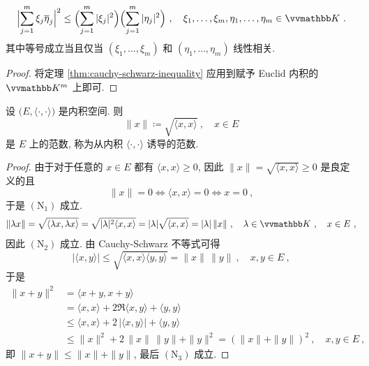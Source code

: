 \begin{corollary}\label{cor:classic-cauchy-schwarz-inequality}
    \[
        \Bigl|\sum_{j = 1}^m \xi_j \overline \eta_j\Bigr|^2 \leq \Bigl(\sum_{j = 1}^m |\xi_j|^2\Bigr) \Bigl(\sum_{j = 1}^m |\eta_j|^2\Bigr)\ ,\quad \xi_1, \ldots, \xi_m, \eta_1, \ldots, \eta_m \in \K\ .
    \]
    其中等号成立当且仅当 \((\xi_1, \ldots, \xi_m)\) 和 \((\eta_1, \ldots, \eta_m)\) 线性相关.
\end{corollary}

\begin{proof}
    将定理 \ref{thm:cauchy-schwarz-inequality} 应用到赋予 Euclid 内积的 \(\K^m\) 上即可.
\end{proof}

\begin{theorem}\label{thm:norm-induced-from-inner-produc}
    设 \(\bigl(E, \langle \cdot, \cdot \rangle\bigr)\) 是内积空间. 则
    \[
        \|x\| \coloneqq \sqrt{\langle x, x \rangle}\ ,\quad x \in E
    \]
    是 \(E\) 上的范数, 称为从内积 \(\langle \cdot, \cdot \rangle\) 诱导的范数.
\end{theorem}

\begin{proof}
    由于对于任意的 \(x \in E\) 都有 \(\langle x, x \rangle \geq 0\), 因此 \(\|x\| = \sqrt{\langle x, x \rangle} \geq 0\) 是良定义的且 
    \[
        \|x\| = 0 \iff \langle x, x \rangle = 0 \iff x = 0\ ,
    \]
    于是 \hyperref[ax:norm]{\((\mathrm N_1)\)} 成立.
    \[
        \|\lambda x\| = \sqrt{\langle \lambda x, \lambda x \rangle} = \sqrt{|\lambda|^2 \langle x, x \rangle} = |\lambda| \sqrt{\langle x, x \rangle} = |\lambda|\, \|x\|\ ,\quad \lambda \in \K\ ,\quad x \in E\ ,
    \]
    因此 \hyperref[ax:norm]{\((\mathrm N_2)\)} 成立. 由 Cauchy-Schwarz 不等式可得
    \[
        |\langle x, y \rangle| \leq \sqrt{\langle x, x \rangle \langle y, y \rangle} = \|x\|\, \|y\|\ ,\quad x, y \in E\ ,
    \]
    于是
    \begin{align*}
        \|x + y\|^2 &= \langle x + y, x + y \rangle \\
        &= \langle x, x \rangle + 2 \Re \langle x, y \rangle + \langle y, y \rangle \\
        &\leq \langle x, x \rangle + 2\, |\langle x, y \rangle| + \langle y, y \rangle \\
        &\leq \|x\|^2 + 2\, \|x\|\, \|y\| + \|y\|^2 = (\|x\| + \|y\|)^2\ ,\quad x, y \in E\ ,
    \end{align*}
    即 \(\|x + y\| \leq \|x\| + \|y\|\), 最后 \hyperref[ax:norm]{\((\mathrm N_3)\)} 成立.
\end{proof}

